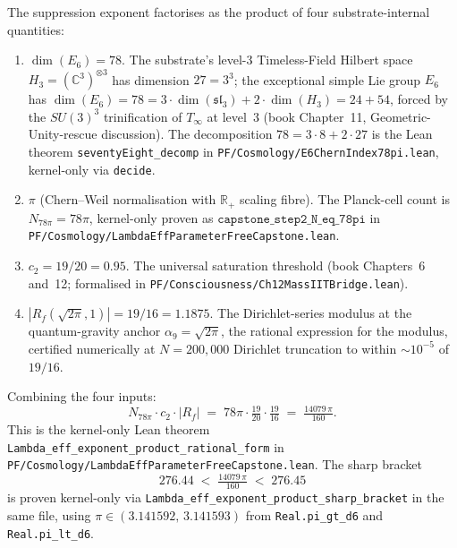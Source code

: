 \documentclass[11pt,a4paper]{amsart}
\theoremstyle{plain}
\theoremstyle{definition}
\begin{document}
The suppression exponent factorises as the product of four substrate-internal quantities:
\begin{enumerate}[label=\textup{(\arabic*)},itemsep=2pt]
\item $\dim(E_6) = 78$. The substrate's level-3 Timeless-Field Hilbert space $H_3 = (\mathbb{C}^3)^{\otimes 3}$ has dimension $27 = 3^3$; the exceptional simple Lie group $E_6$ has $\dim(E_6) = 78 = 3\cdot\dim(\mathfrak{sl}_3) + 2\cdot\dim(H_3) = 24 + 54$, forced by the $SU(3)^3$ trinification of $T_\infty$ at level~3 (book Chapter~11, Geometric-Unity-rescue discussion). The decomposition $78 = 3\cdot 8 + 2\cdot 27$ is the Lean theorem \texttt{seventyEight\_decomp} in \texttt{PF/Cosmology/E6ChernIndex78pi.lean}, kernel-only via \texttt{decide}.

\item $\pi$ (Chern--Weil normalisation with $\mathbb{R}_+$ scaling fibre). The Planck-cell count is $N_{78\pi} = 78\pi$, kernel-only proven as $\texttt{capstone\_step2\_N\_eq\_78pi}$ in \texttt{PF/Cosmology/Lambda\-Eff\-Para\-meter\-Free\-Capstone.lean}.

\item $c_2 = 19/20 = 0.95$. The universal saturation threshold (book Chapters~6 and~12; formalised in \texttt{PF/Consciousness/Ch12MassIITBridge.lean}).

\item $|R_f(\sqrt{2\pi}, 1)| = 19/16 = 1.1875$. The Dirichlet-series modulus at the quantum-gravity anchor $\alpha_9 = \sqrt{2\pi}$, the rational expression for the modulus, certified numerically at $N = 200{,}000$ Dirichlet truncation to within $\sim 10^{-5}$ of $19/16$.
\end{enumerate}

Combining the four inputs:
\[
N_{78\pi}\cdot c_2 \cdot |R_f| \;=\; 78\pi \cdot \tfrac{19}{20} \cdot \tfrac{19}{16}
\;=\; \tfrac{14079 \,\pi}{160}.
\]
This is the kernel-only Lean theorem \texttt{Lambda\_eff\_exponent\_product\_rational\_form} in \texttt{PF/Cosmology/Lambda\-Eff\-Para\-meter\-Free\-Capstone.lean}. The sharp bracket
\[
276.44 \;<\; \tfrac{14079\,\pi}{160} \;<\; 276.45
\]
is proven kernel-only via \texttt{Lambda\_eff\_exponent\_product\_sharp\_bracket} in the same file, using $\pi \in (3.141592,\,3.141593)$ from \texttt{Real.pi\_gt\_d6} and \texttt{Real.pi\_lt\_d6}.
\end{document}
